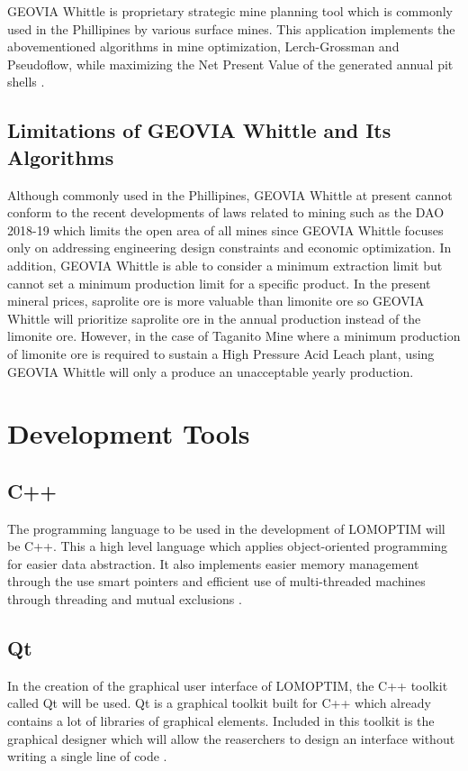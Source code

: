 \documentclass[12pt]{report}
\begin{document}
GEOVIA Whittle is proprietary strategic mine planning tool which is commonly used in the Phillipines by various surface mines.
This application implements the abovementioned algorithms in mine optimization, Lerch-Grossman and Pseudoflow, while maximizing the Net Present Value of the generated annual pit shells \cite{whittle}.

\subsection{Limitations of GEOVIA Whittle and Its Algorithms}

Although commonly used in the Phillipines, GEOVIA Whittle at present cannot conform to the recent developments of laws related to mining such as the DAO 2018-19 \cite{DAO2018-19} which limits the open area of all mines since GEOVIA Whittle focuses only on addressing engineering design constraints and economic optimization.
In addition, GEOVIA Whittle is able to consider a minimum extraction limit but cannot set a minimum production limit for a specific product.
In the present mineral prices, saprolite ore is more valuable than limonite ore so GEOVIA Whittle will prioritize saprolite ore in the annual production instead of the limonite ore.
However, in the case of Taganito Mine where a minimum production of limonite ore is required to sustain a High Pressure Acid Leach plant, using GEOVIA Whittle will only a produce an unacceptable yearly production.

\section{Development Tools}

\subsection{C++}

The programming language to be used in the development of LOMOPTIM will be C++.
This a high level language which applies object-oriented programming for easier data abstraction.
It also implements easier memory management through the use smart pointers and efficient use of multi-threaded machines through threading and mutual exclusions \cite{cpp}.

\subsection{Qt}

In the creation of the graphical user interface of LOMOPTIM, the C++ toolkit called Qt will be used.
Qt is a graphical toolkit built for C++ which already contains a lot of libraries of graphical elements.
Included in this toolkit is the graphical designer which will allow the reaserchers to design an interface without writing a single line of code \cite{qt}.
\end{document}
